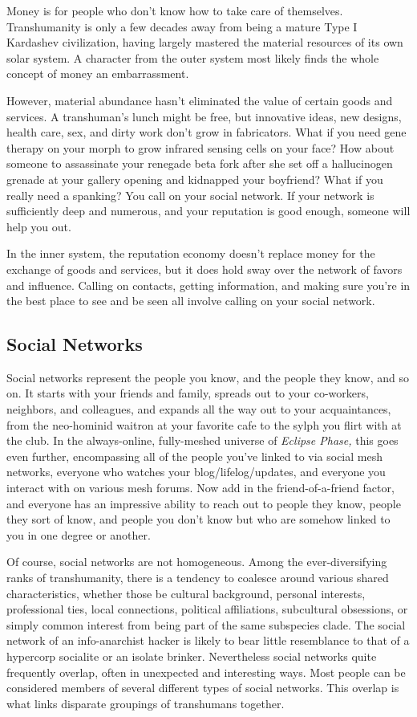 Money is for people who don't know how to take care of themselves. Transhumanity is only a few decades away from being a mature Type I Kardashev civilization, having largely mastered the material resources of its own solar system. A character from the outer system most likely finds the whole concept of money an embarrassment. 

However, material abundance hasn't eliminated the value of certain goods and services. A transhuman's lunch might be free, but innovative ideas, new designs, health care, sex, and dirty work don't grow in fabricators. What if you need gene therapy on your morph to grow infrared sensing cells on your face? How about someone to assassinate your renegade beta fork after she set off a hallucinogen grenade at your gallery opening and kidnapped your boyfriend? What if you really need a spanking? You call on your social network. If your network is sufficiently deep and numerous, and your reputation is good enough, someone will help you out. 

In the inner system, the reputation economy doesn't replace money for the exchange of goods and services, but it does hold sway over the network of favors and influence. Calling on contacts, getting information, and making sure you're in the best place to see and be seen all involve calling on your social network. 

\subsection{Social Networks} 

Social networks represent the people you know, and the people they know, and so on. It starts with your friends and family, spreads out to your co-workers, neighbors, and colleagues, and expands all the way out to your acquaintances, from the neo-hominid waitron at your favorite cafe to the sylph you flirt with at the club. In the always-online, fully-meshed universe of \textit{Eclipse Phase,} this goes even further, encompassing all of the people you've linked to via social mesh networks, everyone who watches your blog/lifelog/updates, and everyone you interact with on various mesh forums. Now add in the friend-of-a-friend factor, and everyone has an impressive ability to reach out to people they know, people they sort of know, and people you don't know but who are somehow linked to you in one degree or another. 

Of course, social networks are not homogeneous. Among the ever-diversifying ranks of transhumanity, there is a tendency to coalesce around various shared characteristics, whether those be cultural background, personal interests, professional ties, local connections, political affiliations, subcultural obsessions, or simply common interest from being part of the same subspecies clade. The social network of an info-anarchist hacker is likely to bear little resemblance to that of a hypercorp socialite or an isolate brinker. Nevertheless social networks quite frequently overlap, often in unexpected and interesting ways. Most people can be considered members of several different types of social networks. This overlap is what links disparate groupings of transhumans together. 

